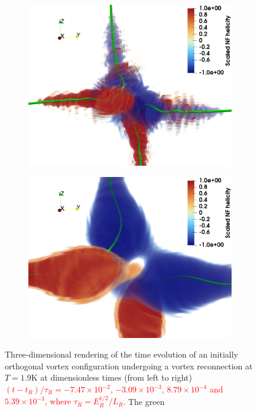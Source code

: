 \documentclass[%
 reprint,
 amsmath,amssymb,
 aps,
 prl,
]{revtex4-2}
\def\red#1{\textcolor{red}{#1}}
\begin{document}
\begin{figure}
\begin{subfigure}[b]{0.24\textwidth}
		\includegraphics*[width=\textwidth]{snaps-hel-3.pdf}
	\end{subfigure}
    \begin{subfigure}[b]{0.24\textwidth}
		\centering
		\includegraphics*[width=\textwidth]{snaps-hel-4.pdf}
	\end{subfigure} \hfill
	\caption{
Three-dimensional rendering of the time evolution of
an initially orthogonal vortex configuration 
undergoing a vortex reconnection at $T = 1.9$K at dimensionless
times (from left to right)
\red{$(t-t_R)/\tau_R=-7.47\times10^{-2}$, $-3.09\times10^{-3}$, $8.79\times10^{-4}$ and $5.39\times10^{-3}$, where $\tau_R = E^{1/2}_R/ L_R$}. The green
}
\end{figure}
\end{document}
